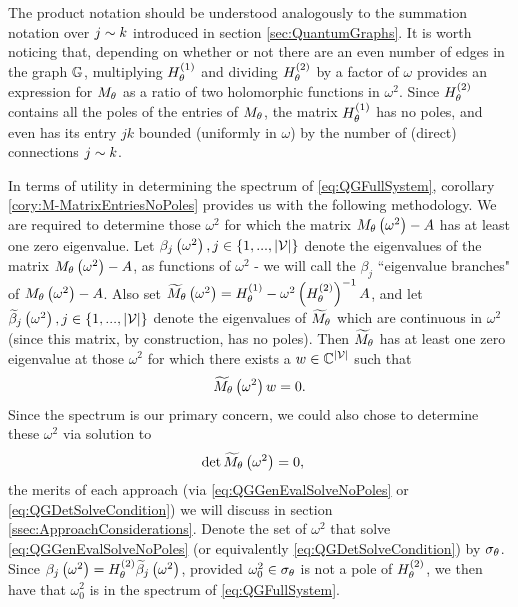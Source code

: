 The product notation should be understood analogously to the summation notation over $j\sim k$ introduced in section \ref{sec:QuantumGraphs}.
It is worth noticing that, depending on whether or not there are an even number of edges in the graph $\mathbb{G}$, multiplying $H^{(1)}_\theta$ and dividing $H^{(2)}_\theta$ by a factor of $\omega$ provides an expression for $M_\theta$ as a ratio of two holomorphic functions in $\omega^2$.
Since $H^{(2)}_\theta$ contains all the poles of the entries of $M_\theta$, the matrix $H^{(1)}_\theta$ has no poles, and even has its entry $jk$ bounded (uniformly in $\omega$) by the number of (direct) connections $j\sim k$.

In terms of utility in determining the spectrum of \eqref{eq:QGFullSystem}, corollary \ref{cory:M-MatrixEntriesNoPoles} provides us with the following methodology.
We are required to determine those $\omega^2$ for which the matrix $M_\theta\left( \omega^2 \right)-A$ has at least one zero eigenvalue.
Let $\beta_j\left( \omega^2 \right), j\in\left\{ 1,...,\left\lvert \mathcal{V} \right\rvert \right\}$ denote the eigenvalues of the matrix $M_\theta\left( \omega^2 \right)-A$, as  functions of $\omega^2$ - we will call the $\beta_j$ ``eigenvalue branches" of $M_\theta\left( \omega^2 \right)-A$.
Also set $\widetilde{M}_\theta\left( \omega^2 \right) = H^{(1)}_\theta - \omega^2 \left( H^{(2)}_\theta \right)^{-1} A$, and let $\widetilde{\beta}_j\left( \omega^2 \right), j\in\left\{ 1,...,\left\lvert \mathcal{V} \right\rvert \right\}$ denote the eigenvalues of $\widetilde{M}_\theta$ which are continuous in $\omega^2$ (since this matrix, by construction, has no poles).
Then $\widetilde{M}_\theta$ has at least one zero eigenvalue at those $\omega^2$ for which there exists a $w\in\mathbb{C}^{\left\lvert \mathcal{V} \right\rvert}$ such that
\begin{align} \label{eq:QGGenEvalSolveNoPoles}
	\widetilde{M}_\theta\left( \omega^2 \right)w = 0.
\end{align}
Since the spectrum is our primary concern, we could also chose to determine these $\omega^2$ via solution to 
\begin{align} \label{eq:QGDetSolveCondition}
	\det\widetilde{M}_\theta\left( \omega^2 \right) &= 0,
\end{align}
the merits of each approach (via \eqref{eq:QGGenEvalSolveNoPoles} or \eqref{eq:QGDetSolveCondition}) we will discuss in section \ref{ssec:ApproachConsiderations}.
Denote the set of $\omega^2$ that solve \eqref{eq:QGGenEvalSolveNoPoles} (or equivalently \eqref{eq:QGDetSolveCondition}) by $\sigma_\theta$.
Since $\beta_j\left( \omega^2 \right) = H_\theta^{(2)}\widetilde{\beta}_j\left( \omega^2 \right)$, provided $\omega_0^2\in\sigma_\theta$ is not a pole of $H_\theta^{(2)}$, we then have that $\omega_0^2$ is in the spectrum of \eqref{eq:QGFullSystem}.
